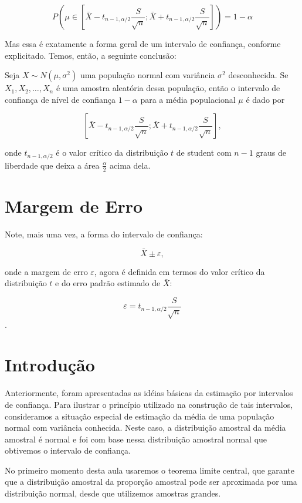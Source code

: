 \documentclass[
]{book}
\begin{document}
\[P\left(\mu \in \left[\bar X-t_{n-1,\alpha/2}\frac{S}{\sqrt{n}};\bar X+t_{n-1,\alpha/2}\frac{S}{\sqrt{n}}\right]\right)=1-\alpha\]

Mas essa é exatamente a forma geral de um intervalo de confiança, conforme explicitado. Temos, então, a seguinte conclusão:

Seja \(X\sim N(\mu, \sigma^2)\) uma população normal com variância \(\sigma^2\) desconhecida. Se \(X_1, X_2,\ldots , X_n\) é uma amostra aleatória dessa população, então o intervalo de confiança de nível de confiança \(1-\alpha\) para a média populacional \(\mu\) é dado por

\[\left[\bar X-t_{n-1,\alpha/2}\frac{S}{\sqrt{n}};\bar X+t_{n-1,\alpha/2}\frac{S}{\sqrt{n}}\right],\]

onde \(t_{n-1,\alpha/2}\) é o valor crítico da distribuição \(t\) de student com \(n-1\) graus de liberdade que deixa a área \(\frac{\alpha}{2}\) acima dela.

\hypertarget{margem-de-erro-1}{%
\section{Margem de Erro}\label{margem-de-erro-1}}

Note, mais uma vez, a forma do intervalo de confiança:

\[\bar X \pm\varepsilon,\]

onde a margem de erro \(\varepsilon\), agora é definida em termos do valor crítico da distribuição \(t\) e do erro padrão estimado de \(\bar X\):

\[\varepsilon=t_{n-1,\alpha/2}\frac{S}{\sqrt{n}}\].

\hypertarget{introduuxe7uxe3o-6}{%
\section{Introdução}\label{introduuxe7uxe3o-6}}

Anteriormente, foram apresentadas as idéias básicas da estimação por intervalos de confiança. Para ilustrar o princípio utilizado na construção de tais intervalos, consideramos a situação especial de estimação da média de uma população normal com variância conhecida. Neste caso, a distribuição amostral da média amostral é normal e foi com base nessa distribuição amostral normal que obtivemos o intervalo de confiança.

No primeiro momento desta aula usaremos o teorema limite central, que garante que a distribuição amostral da proporção amostral pode ser aproximada por uma distribuição normal, desde que utilizemos amostras grandes.
\end{document}
